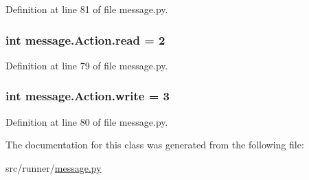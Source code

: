 Definition at line 81 of file message.\+py.

\hypertarget{classmessage_1_1Action_ae443e4320e909dfd9f95ed040a4c8112}{}
\subsubsection[{read}]{\setlength{\rightskip}{0pt plus 5cm}int message.\+Action.\+read = 2\hspace{0.3cm}{\ttfamily [static]}}\label{classmessage_1_1Action_ae443e4320e909dfd9f95ed040a4c8112}


Definition at line 79 of file message.\+py.

\hypertarget{classmessage_1_1Action_a53a056e4ca716e69429a66251ecc3aab}{}
\subsubsection[{write}]{\setlength{\rightskip}{0pt plus 5cm}int message.\+Action.\+write = 3\hspace{0.3cm}{\ttfamily [static]}}\label{classmessage_1_1Action_a53a056e4ca716e69429a66251ecc3aab}


Definition at line 80 of file message.\+py.



The documentation for this class was generated from the following file\+:\begin{DoxyCompactItemize}
\item 
src/runner/\hyperlink{message_8py}{message.\+py}\end{DoxyCompactItemize}
